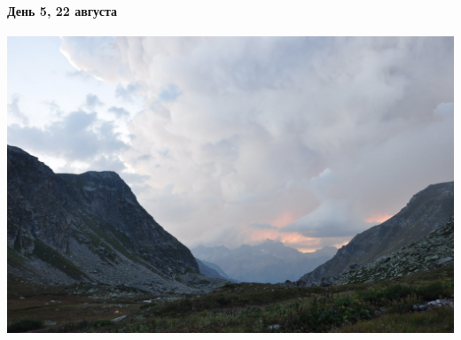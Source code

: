 \begin{frame}
	\frametitle{\textAlpha\textpi \textomikron\textkappa\textalpha\textlambda\textnu\textpsi\textiota\textvarsigma}
	\framesubtitle{День 5, 22 августа}
	\centering
	\includegraphics[width=\textwidth]{../pics/DSC_0010}			
\end{frame}
